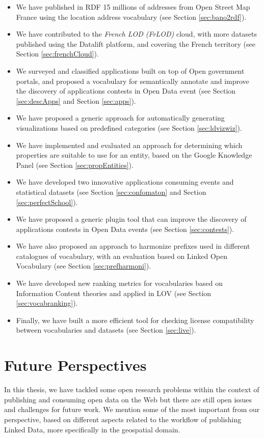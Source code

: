 \documentclass[a4paper,11pt,twoside]{report}
\begin{document}
\begin{itemize}
\item We have published in RDF 15 millions of addresses from Open Street Map France using the location address vocabulary (see Section \ref{sec:bano2rdf}).
\item We have contributed to the \textit{French LOD (FrLOD)} cloud, with more datasets published using the Datalift platform, and covering the French territory (see Section \ref{sec:frenchCloud}).
\item We surveyed and classified applications built on top of Open government portals, and proposed a vocabulary for semantically annotate and improve the discovery of applications contests in Open Data event (see Section \ref{sec:descApps} and Section \ref{sec:apps}).
\item We have proposed a generic approach for automatically generating visualizations based on predefined categories (see Section \ref{sec:ldvizwiz}).
\item We have implemented and evaluated an approach for determining which properties are suitable to use for an entity, based on the Google Knowledge Panel (see Section \ref{sec:propEntities}).
\item We have developed two innovative applications consuming events and statistical datasets (see Section \ref{sec:confomaton} and Section \ref{sec:perfectSchool}).
\item We have proposed a generic plugin tool that can improve the discovery of applications contests in Open Data events (see Section \ref{sec:contests}).
\item We have also proposed an approach to harmonize prefixes used in different catalogues of vocabulary, with an evaluation based on Linked Open Vocabulary (see Section \ref{sec:prefharmoni}).
\item We have developed new ranking metrics for vocabularies based on Information Content theories and applied in LOV (see Section \ref{sec:vocabranking}).

\item Finally, we have built a more efficient tool for checking license compatibility between vocabularies and datasets (see Section \ref{sec:live}).
\end{itemize}


\section{Future Perspectives}
\label{sec:future}

In this thesis, we have tackled some open research problems within the context of publishing and consuming open data on the Web but there are still open issues and challenges for future work. We  mention some of the most important from our perspective, based on different aspects related to the workflow of publishing Linked Data, more specifically in the geospatial domain. 
\end{document}
